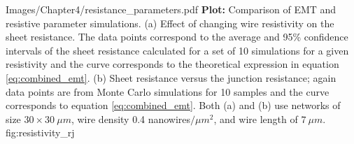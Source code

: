 \begin{comment}As mentioned in the derivation of the effective medium theory, it is most accurate when the current flow distribution is homogeneous across the NWN. It may be that the increasing junction resistance results in a more localised current flow which the effective medium theory is less applicable. If current flow does become inhomogeneous then the approximation of $N_y$ parallel paths also becomes less applicable, which would effect the approximation of the sheet resistance. Thus the effective square lattice is most accurate for networks whose junction resistances and wire segment resistance are comparable to one another, and will become less accurate if junction dominant or intra-wire dominant resistive networks. \footnote{may add this paragraph and Figure \ref{fig:resistivity_rj} to an Appendix or remove it entirely}
\end{comment}
{Images/Chapter4/resistance_parameters.pdf}
{\textbf{Plot:} Comparison of EMT and resistive parameter simulations.}
{(a) Effect of changing wire resistivity on the sheet resistance. The data points correspond to the average and 95\% confidence intervals of the sheet resistance calculated for a set of 10 simulations for a given resistivity and the curve corresponds to the theoretical expression in equation \ref{eq:combined_emt}. (b) Sheet resistance versus the junction resistance; again data points are from Monte Carlo simulations for 10 samples and the curve corresponds to equation \ref{eq:combined_emt}. Both (a) and (b) use networks of size $30\times 30~ \mu m$, wire density 0.4 nanowires$/\mu m^2$, and wire length of $7~ \mu m$.}
{fig:resistivity_rj}


